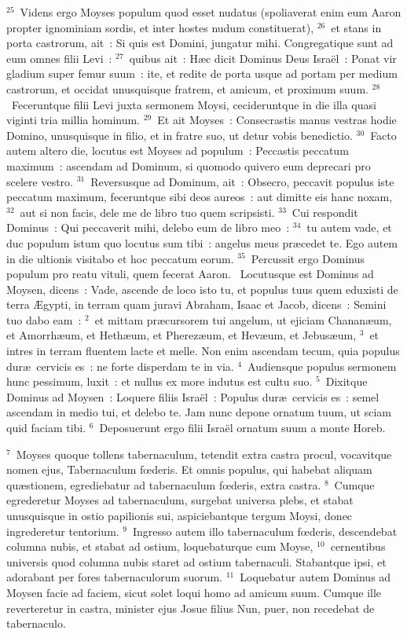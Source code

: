 ${}^{25}$~Videns ergo Moyses populum quod esset nudatus (spoliaverat enim eum Aaron propter ignominiam sordis, et inter hostes nudum constituerat),
${}^{26}$~et stans in porta castrorum, ait~: Si quis est Domini, jungatur mihi. Congregatique sunt ad eum omnes filii Levi~:
${}^{27}$~quibus ait~: H\ae c dicit Dominus Deus Isra\"el~: Ponat vir gladium super femur suum~: ite, et redite de porta usque ad portam per medium castrorum, et occidat unusquisque fratrem, et amicum, et proximum suum.
${}^{28}$~Feceruntque filii Levi juxta sermonem Moysi, cecideruntque in die illa quasi viginti tria millia hominum.
${}^{29}$~Et ait Moyses~: Consecrastis manus vestras hodie Domino, unusquisque in filio, et in fratre suo, ut detur vobis benedictio.
${}^{30}$~Facto autem altero die, locutus est Moyses ad populum~: Peccastis peccatum maximum~: ascendam ad Dominum, si quomodo quivero eum deprecari pro scelere vestro.
${}^{31}$~Reversusque ad Dominum, ait~: Obsecro, peccavit populus iste peccatum maximum, feceruntque sibi deos aureos~: aut dimitte eis hanc noxam,
${}^{32}$~aut si non facis, dele me de libro tuo quem scripsisti.
${}^{33}$~Cui respondit Dominus~: Qui peccaverit mihi, delebo eum de libro meo~:
${}^{34}$~tu autem vade, et duc populum istum quo locutus sum tibi~: angelus meus pr\ae cedet te. Ego autem in die ultionis visitabo et hoc peccatum eorum.
${}^{35}$~Percussit ergo Dominus populum pro reatu vituli, quem fecerat Aaron.
~Locutusque est Dominus ad Moysen, dicens~: Vade, ascende de loco isto tu, et populus tuus quem eduxisti de terra \AE gypti, in terram quam juravi Abraham, Isaac et Jacob, dicens~: Semini tuo dabo eam~:
${}^{2}$~et mittam pr\ae cursorem tui angelum, ut ejiciam Chanan\ae um, et Amorrh\ae um, et Heth\ae um, et Pherez\ae um, et Hev\ae um, et Jebus\ae um,
${}^{3}$~et intres in terram fluentem lacte et melle. Non enim ascendam tecum, quia populus dur\ae\ cervicis es~: ne forte disperdam te in via.
${}^{4}$~Audiensque populus sermonem hunc pessimum, luxit~: et nullus ex more indutus est cultu suo.
${}^{5}$~Dixitque Dominus ad Moysen~: Loquere filiis Isra\"el~: Populus dur\ae\ cervicis es~: semel ascendam in medio tui, et delebo te. Jam nunc depone ornatum tuum, ut sciam quid faciam tibi.
${}^{6}$~Deposuerunt ergo filii Isra\"el ornatum suum a monte Horeb.


${}^{7}$~Moyses quoque tollens tabernaculum, tetendit extra castra procul, vocavitque nomen ejus, Tabernaculum fœderis. Et omnis populus, qui habebat aliquam qu\ae stionem, egrediebatur ad tabernaculum fœderis, extra castra.
${}^{8}$~Cumque egrederetur Moyses ad tabernaculum, surgebat universa plebs, et stabat unusquisque in ostio papilionis sui, aspiciebantque tergum Moysi, donec ingrederetur tentorium.
${}^{9}$~Ingresso autem illo tabernaculum fœderis, descendebat columna nubis, et stabat ad ostium, loquebaturque cum Moyse,
${}^{10}$~cernentibus universis quod columna nubis staret ad ostium tabernaculi. Stabantque ipsi, et adorabant per fores tabernaculorum suorum.
${}^{11}$~Loquebatur autem Dominus ad Moysen facie ad faciem, sicut solet loqui homo ad amicum suum. Cumque ille reverteretur in castra, minister ejus Josue filius Nun, puer, non recedebat de tabernaculo.


